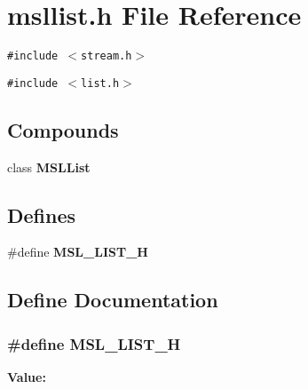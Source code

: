 \section{msllist.h File Reference}
\label{msllist_8h}
{\tt \#include $<$stream.h$>$}\par
{\tt \#include $<$list.h$>$}\par
\subsection*{Compounds}
\begin{CompactItemize}
\item 
class {\bf MSLList}
\end{CompactItemize}
\subsection*{Defines}
\begin{CompactItemize}
\item 
\#define {\bf MSL\_\-LIST\_\-H}
\end{CompactItemize}


\subsection{Define Documentation}
\subsubsection{\setlength{\rightskip}{0pt plus 5cm}\#define MSL\_\-LIST\_\-H}\label{msllist_8h_a0}


{\bf Value:}\footnotesize\begin{verbatim}
\end{verbatim}\normalsize 
